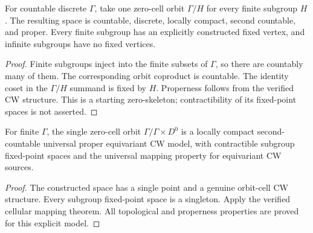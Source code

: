 \begin{proposition}\label{prop:universal-zero-skeleton}
For countable discrete $\Gamma$, take one zero-cell orbit $\Gamma/H$ for
every finite subgroup $H$. The resulting space is countable, discrete,
locally compact, second countable, and proper. Every finite subgroup has
an explicitly constructed fixed vertex, and infinite subgroups have no
fixed vertices.
\end{proposition}
\begin{proof}
\leanok
Finite subgroups inject into the finite subsets of $\Gamma$, so there are
countably many of them. The corresponding orbit coproduct is countable.
The identity coset in the $\Gamma/H$ summand is fixed by $H$. Properness
follows from the verified CW structure. This is a starting zero-skeleton;
contractibility of its fixed-point spaces is not asserted.
\end{proof}

\begin{proposition}\label{prop:finite-group-genuine-cw-model}
For finite $\Gamma$, the single zero-cell orbit $\Gamma/\Gamma\times D^0$
is a locally compact second-countable universal proper equivariant CW
model, with contractible subgroup fixed-point spaces and the universal
mapping property for equivariant CW sources.
\end{proposition}
\begin{proof}
\leanok
The constructed space has a single point and a genuine orbit-cell CW
structure. Every subgroup fixed-point space is a singleton. Apply the
verified cellular mapping theorem. All topological and properness
properties are proved for this explicit model.
\end{proof}

